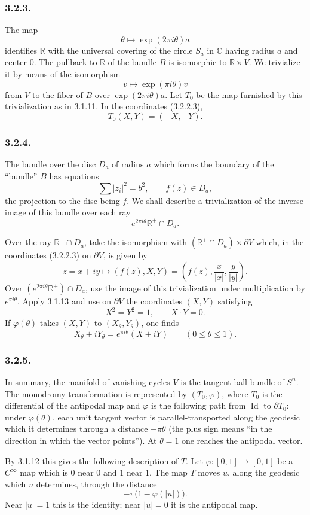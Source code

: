\subsubsection*{3.2.3.}
The map
\[
\theta\longmapsto \exp(2\pi i\theta)a
\]
identifies $\mathbb R$ with the universal covering of the circle
$S_a$ in $\mathbb C$ having radius $a$ and center $0$.  The pullback
to $\mathbb R$ of the bundle $B$ is isomorphic to $\mathbb R\times V$.
We trivialize it by means of the isomorphism
\[
v\longmapsto \exp(\pi i\theta)v
\]
from $V$ to the fiber of $B$ over $\exp(2\pi i\theta)a$.  Let $T_0$
be the map furnished by this trivialization as in 3.1.11.  In the
coordinates (3.2.2.3),
\[
T_0(X,Y)=(-X,-Y).
\]

\subsubsection*{3.2.4.}
The bundle over the disc $D_a$ of radius $a$ which forms the boundary
of the ``bundle'' $B$ has equations
\[
\sum |z_i|^2=b^2,
\qquad
f(z)\in D_a,
\]
the projection to the disc being $f$.  We shall describe a
trivialization of the inverse image of this bundle over each ray
\[
e^{2\pi i\theta}\mathbb R^+\cap D_a.
\]

Over the ray $\mathbb R^+\cap D_a$, take the isomorphism with
$(\mathbb R^+\cap D_a)\times\partial V$ which, in the coordinates
(3.2.2.3) on $\partial V$, is given by
\[
z=x+iy\longmapsto(f(z),X,Y)
  =\left(f(z),\frac{x}{|x|},\frac{y}{|y|}\right).
\]
Over $(e^{2\pi i\theta}\mathbb R^+)\cap D_a$, use the image of this
trivialization under multiplication by $e^{\pi i\theta}$.  Apply
3.1.13 and use on $\partial V$ the coordinates $(X,Y)$ satisfying
\begin{equation}\tag{3.2.4.1}
X^2=Y^2=1,
\qquad
X\mathbin{\cdot}Y=0.
\end{equation}
If $\varphi(\theta)$ takes $(X,Y)$ to $(X_\theta,Y_\theta)$, one finds
\begin{equation}\tag{3.2.4.2}
X_\theta+iY_\theta
=e^{\pi i\theta}(X+iY)
\qquad(0\leq\theta\leq1).
\end{equation}

\subsubsection*{3.2.5.}
In summary, the manifold of vanishing cycles $V$ is the tangent ball
bundle of $S^n$.  The monodromy transformation is represented by
$(T_0,\varphi)$, where $T_0$ is the differential of the antipodal map
and $\varphi$ is the following path from $\operatorname{Id}$ to
$\partial T_0$: under $\varphi(\theta)$, each unit tangent vector is
parallel-transported along the geodesic which it determines through a
distance $+\pi\theta$ (the plus sign means ``in the direction in which
the vector points'').  At $\theta=1$ one reaches the antipodal vector.

By 3.1.12 this gives the following description of $T$.  Let
$\varphi:[0,1]\to[0,1]$ be a $C^\infty$ map which is $0$ near $0$ and
$1$ near $1$.  The map $T$ moves $u$, along the geodesic which $u$
determines, through the distance
\[
-\pi\bigl(1-\varphi(|u|)\bigr).
\]
Near $|u|=1$ this is the identity; near $|u|=0$ it is the antipodal
map.
